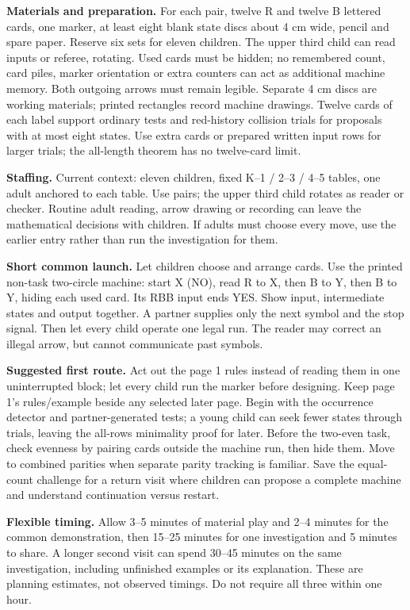 \documentclass[11pt]{article}
\begin{document}
\textbf{Materials and preparation.} For each pair, twelve R and twelve B lettered cards, one marker, at least eight blank state discs about 4 cm wide, pencil and spare paper. Reserve six sets for eleven children. The upper third child can read inputs or referee, rotating. Used cards must be hidden; no remembered count, card piles, marker orientation or extra counters can act as additional machine memory. Both outgoing arrows must remain legible. Separate 4 cm discs are working materials; printed rectangles record machine drawings. Twelve cards of each label support ordinary tests and red-history collision trials for proposals with at most eight states. Use extra cards or prepared written input rows for larger trials; the all-length theorem has no twelve-card limit.

\textbf{Staffing.} Current context: eleven children, fixed K--1 / 2--3 / 4--5 tables, one adult anchored to each table. Use pairs; the upper third child rotates as reader or checker. Routine adult reading, arrow drawing or recording can leave the mathematical decisions with children. If adults must choose every move, use the earlier entry rather than run the investigation for them.

\textbf{Short common launch.} Let children choose and arrange cards. Use the printed non-task two-circle machine: start X (NO), read R to X, then B to Y, then B to Y, hiding each used card. Its RBB input ends YES. Show input, intermediate states and output together. A partner supplies only the next symbol and the stop signal. Then let every child operate one legal run. The reader may correct an illegal arrow, but cannot communicate past symbols.

\textbf{Suggested first route.} Act out the page 1 rules instead of reading them in one uninterrupted block; let every child run the marker before designing. Keep page 1’s rules/example beside any selected later page. Begin with the occurrence detector and partner-generated tests; a young child can seek fewer states through trials, leaving the all-rows minimality proof for later. Before the two-even task, check evenness by pairing cards outside the machine run, then hide them. Move to combined parities when separate parity tracking is familiar. Save the equal-count challenge for a return visit where children can propose a complete machine and understand continuation versus restart.

\textbf{Flexible timing.} Allow 3--5 minutes of material play and 2--4 minutes for the common demonstration, then 15--25 minutes for one investigation and 5 minutes to share. A longer second visit can spend 30--45 minutes on the same investigation, including unfinished examples or its explanation. These are planning estimates, not observed timings. Do not require all three within one hour.
\end{document}
